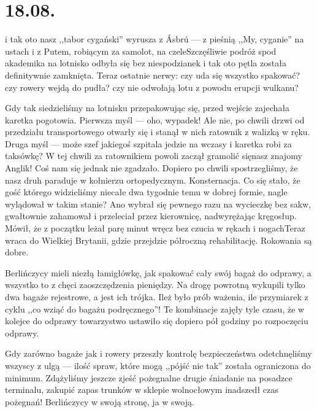 \chapter*{18.08.}

\textellipsis i tak oto nasz ,,tabor cygański'' wyrusza z Ásbrú --- z pieśnią ,,My, cyganie'' na ustach i z Putem, robiącym za samolot, na czele\textellipsis Szczęśliwie podróż spod akademika na lotnisko odbyła się bez niespodzianek i tak oto pętla została definitywnie zamknięta. Teraz ostatnie nerwy: czy uda się wszystko spakować? czy rowery wejdą do pudła? czy nie odwołają lotu z powodu erupcji wulkanu?

Gdy tak siedzieliśmy na lotnisku przepakowując się, przed wejście zajechała karetka pogotowia. Pierwsza myśl --- oho, wypadek! Ale nie, po chwili drzwi od przedziału transportowego otwarły się i stanął w nich ratownik z walizką w ręku. Druga myśl --- może szef jakiegoś szpitala jedzie na wczasy i karetka robi za taksówkę? W tej chwili za ratownikiem powoli zaczął gramolić się\textellipsis nasz znajomy Anglik! Coś nam się jednak nie zgadzało. Dopiero po chwili spostrzegliśmy, że nasz druh paraduje w kołnierzu ortopedycznym. Konsternacja. Co się stało, że gość którego widzieliśmy niecałe dwa tygodnie temu w dobrej formie, nagle wylądował w takim stanie? Ano wybrał się pewnego razu na wycieczkę bez sakw, gwałtownie zahamował i przeleciał przez kierownicę, nadwyrężając kręgosłup. Mówił, że z początku leżał parę minut wręcz bez czucia w rękach i nogach\textellipsis Teraz wraca do Wielkiej Brytanii, gdzie przejdzie półroczną rehabilitację. Rokowania są dobre.

Berlińczycy mieli niezłą łamigłówkę, jak spakować cały swój bagaż do odprawy, a wszystko to z chęci zaoszczędzenia pieniędzy. Na drogę powrotną wykupili tylko dwa bagaże rejestrowe, a jest ich trójka. Ileż było prób ważenia, ile przymiarek z cyklu ,,co wziąć do bagażu podręcznego''! Te kombinacje zajęły tyle czasu, że w kolejce do odprawy towarzystwo ustawiło się dopiero pół godziny po rozpoczęciu odprawy.


Gdy zarówno bagaże jak i rowery przeszły kontrolę bezpieczeństwa odetchnęliśmy wszyscy z ulgą --- ilość spraw, które mogą ,,pójść nie tak'' została ograniczona do minimum. Zdążyliśmy jeszcze zjeść pożegnalne drugie śniadanie na posadzce terminalu, zakupić zapas trunków w sklepie wolnocłowym i\textellipsis nadszedł czas pożegnań! Berlińczycy w swoją stronę, ja w swoją.

